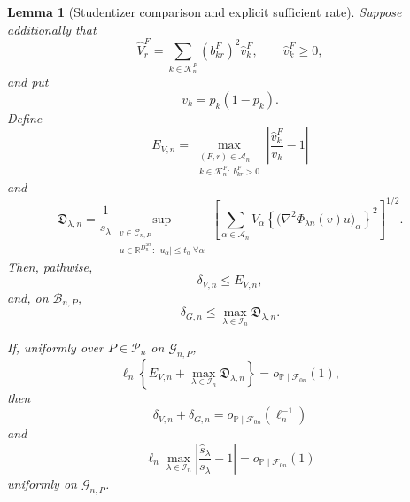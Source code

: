 \documentclass[11pt]{article}
\newtheorem{lemma}[theorem]{Lemma}
\theoremstyle{definition}
\newcommand{\1}{\mathbf 1}\newcommand{\op}{\operatorname}
\begin{document}
\begin{lemma}[Studentizer comparison and explicit sufficient rate]
Suppose additionally that
\begin{equation}
\widehat V_r^F
=
\sum_{k\in\mathcal K_n^F}
(b_{kr}^F)^2\widehat v_k^F,
\qquad
\widehat v_k^F\ge0,
\label{eq:dyad-level-meat-final}
\end{equation}
and put
\[
v_k=p_k(1-p_k).
\]
Define
\begin{equation}
E_{V,n}
=
\max_{\substack{
(F,r)\in\mathcal A_n\\
k\in\mathcal K_n^F:\ b_{kr}^F>0}}
\left|
\frac{\widehat v_k^F}{v_k}-1
\right|
\label{eq:dyad-variance-relative-error}
\end{equation}
and
\begin{equation}
\mathfrak D_{\lambda,n}
=
\frac{1}{s_\lambda}
\sup_{\substack{
v\in\mathcal C_{n,P}\\
u\in\mathbb R^{D_n^{\mathrm{act}}}:
\,|u_\alpha|\le t_\alpha\ \forall\alpha}}
\left[
\sum_{\alpha\in\mathcal A_n}
V_\alpha
\left\{
\bigl(\nabla^2\Phi_{\lambda n}(v)u\bigr)_\alpha
\right\}^2
\right]^{1/2}.
\label{eq:gradient-change-envelope}
\end{equation}
Then, pathwise,
\begin{equation}
\delta_{V,n}\le E_{V,n},
\label{eq:delta-v-explicit-bound}
\end{equation}
and, on $\mathcal B_{n,P}$,
\begin{equation}
\delta_{G,n}
\le
\max_{\lambda\in\mathcal I_n}
\mathfrak D_{\lambda,n}.
\label{eq:delta-g-explicit-bound}
\end{equation}

If, uniformly over $P\in\mathcal P_n$ on
$\mathcal G_{n,P}$,
\begin{equation}
\ell_n
\left\{
E_{V,n}
+
\max_{\lambda\in\mathcal I_n}
\mathfrak D_{\lambda,n}
\right\}
=
o_{\mathbb P\mid\mathcal F_{0n}}(1),
\label{eq:explicit-studentizer-rate}
\end{equation}
then
\begin{equation}
\delta_{V,n}+\delta_{G,n}
=
o_{\mathbb P\mid\mathcal F_{0n}}(\ell_n^{-1})
\label{eq:studentizer-component-rate}
\end{equation}
and
\begin{equation}
\ell_n
\max_{\lambda\in\mathcal I_n}
\left|
\frac{\widehat s_\lambda}{s_\lambda}-1
\right|
=
o_{\mathbb P\mid\mathcal F_{0n}}(1)
\label{eq:studentizer-conclusion-final}
\end{equation}
uniformly on $\mathcal G_{n,P}$.
\end{lemma}
\end{document}
